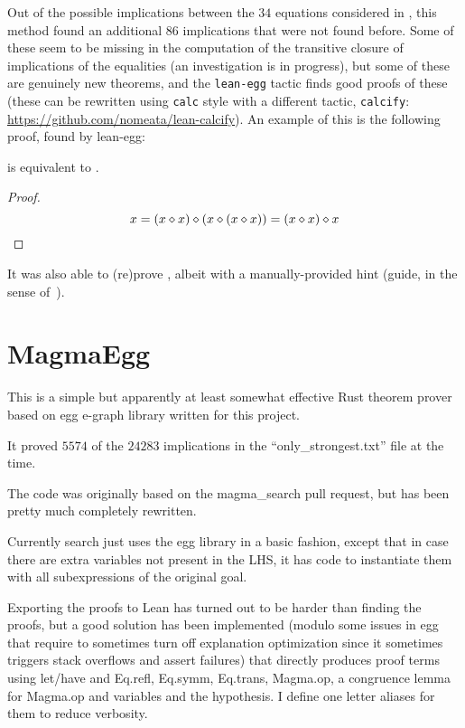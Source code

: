 Out of the possible implications between the $34$ equations considered in , this method found an additional 86 implications that were not found before.
Some of these seem to be missing in the computation of the transitive closure of implications of the equalities (an investigation is in progress), but some of these are genuinely new theorems, and the \texttt{lean-egg} tactic finds good proofs of these (these can be rewritten using \texttt{calc} style with a different tactic, \texttt{calcify}: \url{https://github.com/nomeata/lean-calcify}). An example of this is the following proof, found by lean-egg:

\begin{theorem}[14 implies 23]\label{14_implies_23} \leanok  {} is equivalent to .
\end{theorem}

\begin{proof}\leanok

$$ x = (x \diamond x) \diamond (x \diamond (x \diamond x)) = (x \diamond x) \diamond x $$
\end{proof}

It was also able to (re)prove , albeit with a manually-provided hint (guide, in the sense of~\cite{DBLP:journals/pacmpl/KoehlerGBGTS24}).

\section{MagmaEgg}

This is a simple but apparently at least somewhat effective Rust theorem prover based on egg e-graph library written for this project.

It proved $5574$ of the $24283$ implications in the ``only\_strongest.txt'' file at the time.

The code was originally based on the magma\_search pull request, but has been pretty much completely rewritten.

Currently search just uses the egg library in a basic fashion, except that in case there are extra variables not present in the LHS, it has code to instantiate them with all subexpressions of the original goal.

Exporting the proofs to Lean has turned out to be harder than finding the proofs, but a good solution has been implemented (modulo some issues in egg that require to sometimes turn off explanation optimization since it sometimes triggers stack overflows and assert failures) that directly produces proof terms using let/have and Eq.refl, Eq.symm, Eq.trans, Magma.op, a congruence lemma for Magma.op and variables and the hypothesis. I define one letter aliases for them to reduce verbosity.

